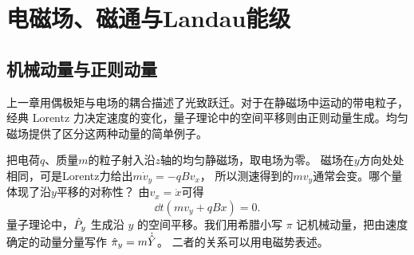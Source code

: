 \chapter{电磁场、磁通与Landau能级}
\label{ch:em}

\section{机械动量与正则动量}
上一章用偶极矩与电场的耦合描述了光致跃迁。对于在静磁场中运动的带电粒子，
经典 Lorentz 力决定速度的变化，量子理论中的空间平移则由正则动量生成。均匀磁场提供了区分这两种动量的简单例子。

把电荷$q$、质量$m$的粒子射入沿$z$轴的均匀静磁场，取电场为零。
磁场在$y$方向处处相同，可是Lorentz力给出$m\dot v_y = -qBv_x$，
所以测速得到的$mv_y$通常会变。哪个量体现了沿$y$平移的对称性？
由$v_x = \dot x$可得
\begin{equation}
    \dd{t}(mv_y + qBx) = 0.
\end{equation}
量子理论中，$\hat{P}_y$ 生成沿 $y$ 的空间平移。我们用希腊小写 $\pi$ 记机械动量，把由速度确定的动量分量写作 $\hat{\pi}_y = m\dot{\hat{Y}}$。
二者的关系可以用电磁势表述。

